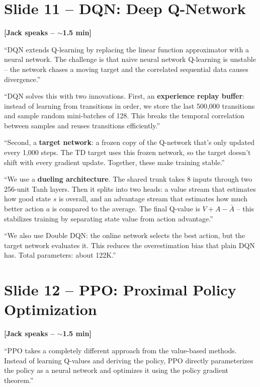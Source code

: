 \documentclass[11pt, letterpaper]{article}
\begin{document}
\section{Slide 11 -- DQN: Deep Q-Network}

\textbf{[Jack speaks -- $\sim$1.5 min]}

``DQN extends Q-learning by replacing the linear function approximator with a neural network. The challenge is that naive neural network Q-learning is unstable -- the network chases a moving target and the correlated sequential data causes divergence.''

``DQN solves this with two innovations. First, an \textbf{experience replay buffer}: instead of learning from transitions in order, we store the last 500,000 transitions and sample random mini-batches of 128. This breaks the temporal correlation between samples and reuses transitions efficiently.''

``Second, a \textbf{target network}: a frozen copy of the Q-network that's only updated every 1,000 steps. The TD target uses this frozen network, so the target doesn't shift with every gradient update. Together, these make training stable.''

``We use a \textbf{dueling architecture}. The shared trunk takes 8 inputs through two 256-unit Tanh layers. Then it splits into two heads: a value stream that estimates how good state $s$ is overall, and an advantage stream that estimates how much better action $a$ is compared to the average. The final Q-value is $V + A - \bar{A}$ -- this stabilizes training by separating state value from action advantage.''

``We also use Double DQN: the online network selects the best action, but the target network evaluates it. This reduces the overestimation bias that plain DQN has. Total parameters: about 122K.''

\section{Slide 12 -- PPO: Proximal Policy Optimization}

\textbf{[Jack speaks -- $\sim$1.5 min]}

``PPO takes a completely different approach from the value-based methods. Instead of learning Q-values and deriving the policy, PPO directly parameterizes the policy as a neural network and optimizes it using the policy gradient theorem.''
\end{document}
